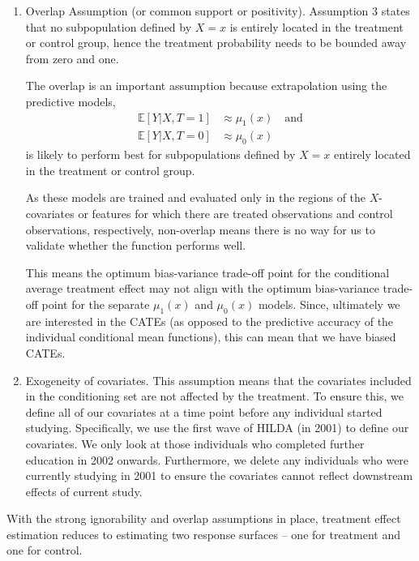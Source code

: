 \documentclass[12pt, a4paper]{article}
\begin{document}
\begin{enumerate}
  \item Overlap Assumption (or common support or positivity). Assumption 3 states that no subpopulation defined by $X = x$ is entirely located in the treatment or control group, hence the treatment probability needs to be bounded away from zero and one.
  
The overlap is an important assumption because extrapolation using the predictive models, 
\begin{align}
  \mathbb{E}[Y|X, T=1] &\approx \mu_1(x) \quad \textrm{and} \label{eq:T1} \\
  \mathbb{E}[Y|X, T=0] &\approx \mu_0(x) \label{eq:T0}
\end{align}
is likely to perform best for subpopulations defined by $X = x$ entirely located in the treatment or control group.

As these models are trained and evaluated only in the regions of the $X$-covariates or features for which there are treated observations and control observations, respectively, non-overlap means there is no way for us to validate whether the function performs well.  

This means the optimum bias-variance trade-off point for the conditional average treatment effect may not align with the optimum bias-variance trade-off point for the separate $\mu_1(x)$ and $\mu_0(x)$ models. Since, ultimately we are interested in the CATEs (as opposed to the predictive accuracy of the individual conditional mean functions), this can mean that we have biased CATEs.


  \item Exogeneity of covariates. This assumption means that the covariates included in the conditioning set are not affected by the treatment. To ensure this, we define all of our covariates at a time point before any individual started studying. Specifically, we use the first wave of HILDA (in 2001) to define our covariates. We only look at those individuals who completed further education in 2002 onwards. Furthermore, we delete any individuals who were currently studying in 2001 to ensure the covariates cannot reflect downstream effects of current study. 

\end{enumerate}

With the strong ignorability and overlap assumptions in place, treatment effect estimation reduces to estimating two response surfaces – one for treatment and one for control.
\end{document}
